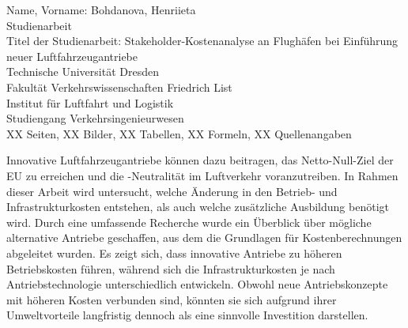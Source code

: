 \newpage
\thispagestyle{empty}
\begin{minipage}[\textheight]{145mm}

\vspace{10mm}

Name, Vorname: Bohdanova, Henriieta\\
Studienarbeit\\

Titel der Studienarbeit: Stakeholder-Kostenanalyse an Flughäfen bei Einführung neuer Luftfahrzeugantriebe\\

Technische Universität Dresden\\
Fakultät Verkehrswissenschaften \glqq Friedrich List\grqq{}\\
Institut für Luftfahrt und Logistik\\

Studiengang Verkehrsingenieurwesen\\
XX Seiten, XX Bilder, XX Tabellen, XX Formeln, XX Quellenangaben 
		
\vspace{15mm}

\begin{minipage}[\textheight]{145mm}
 
\vspace{10mm}

 
Innovative Luftfahrzeugantriebe können dazu beitragen, das Netto-Null-Ziel der EU zu erreichen und die -Neutralität im Luftverkehr voranzutreiben.
In Rahmen dieser Arbeit wird untersucht, welche Änderung in den Betrieb- und Infrastrukturkosten entstehen, 
als auch welche zusätzliche Ausbildung benötigt wird. Durch eine umfassende Recherche wurde ein Überblick über mögliche alternative Antriebe geschaffen, aus dem die Grundlagen für Kostenberechnungen abgeleitet wurden.
Es zeigt sich, dass innovative Antriebe zu höheren Betriebskosten führen, während sich die Infrastrukturkosten je nach Antriebstechnologie unterschiedlich entwickeln.
Obwohl neue Antriebskonzepte mit höheren Kosten verbunden sind, könnten sie sich aufgrund ihrer Umweltvorteile 
langfristig dennoch als eine sinnvolle Investition darstellen.


 
\end{minipage}\hspace{4cm}



\end{minipage}
\cleardoublepage